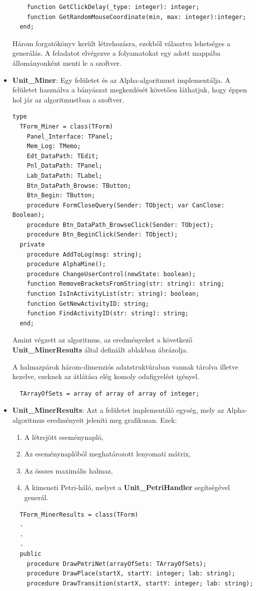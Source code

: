 \begin{itemize}
{\begin{lstlisting}
    function GetClickDelay(_type: integer): integer;
    function GetRandomMouseCoordinate(min, max: integer):integer;
  end;

	\end{lstlisting}

		Három forgatókönyv került létrehozásra, ezekből választva lehetséges a generálás. A feladatot elvégezve a folyamatokat egy adott mappába állományonként menti le a szoftver.
	}
	\item{
		\textbf{Unit\_Miner}: Egy felületet és az Alpha-algoritmust implementálja. A felületet használva a bányászat megkezdését követően láthatjuk, hogy éppen hol jár az algoritmustban a szoftver.
	\begin{lstlisting}
type
  TForm_Miner = class(TForm)
    Panel_Interface: TPanel;
    Mem_Log: TMemo;
    Edt_DataPath: TEdit;
    Pnl_DataPath: TPanel;
    Lab_DataPath: TLabel;
    Btn_DataPath_Browse: TButton;
    Btn_Begin: TButton;
    procedure FormCloseQuery(Sender: TObject; var CanClose: Boolean);
    procedure Btn_DataPath_BrowseClick(Sender: TObject);
    procedure Btn_BeginClick(Sender: TObject);
  private
    procedure AddToLog(msg: string);
    procedure AlphaMine();
    procedure ChangeUserControl(newState: boolean);
    function RemoveBracketsFromString(str: string): string;
    function IsInActivityList(str: string): boolean;
    function GetNewActivityID: string;
    function FindActivityID(str: string): string;
  end;
	\end{lstlisting}

Amint végzett az algoritmus, az eredményeket a következő \textbf{Unit\_MinerResults} által definiált ablakban ábrázolja.

A halmazpárok három-dimenziós adatstruktúraban vannak tárolva illetve kezelve, ezeknek az átlátása elég komoly odafigyelést igényel.
	\begin{lstlisting}
  TArrayOfSets = array of array of array of integer;
	\end{lstlisting}

	}
	\item{
		\textbf{Unit\_MinerResults}: Azt a felületet implementáló egység, mely az Alpha-algoritmus eredményeit jeleníti meg grafikusan. Ezek:
		\begin{enumerate}
			\item{A létrejött eseménynapló,}
			\item{Az eseménynaplóból meghatározott lenyomati mátrix,}
			\item{Az összes maximális halmaz,}
			\item{A kimeneti Petri-háló, melyet a \textbf{Unit\_PetriHandler} segítségével generál.}
		\end{enumerate}
		\begin{lstlisting}
  TForm_MinerResults = class(TForm)
  .
  .
  .
  public
    procedure DrawPetriNet(arrayOfSets: TArrayOfSets);
    procedure DrawPlace(startX, startY: integer; lab: string);
    procedure DrawTransition(startX, startY: integer; lab: string);


\end{lstlisting}}
\end{itemize}
